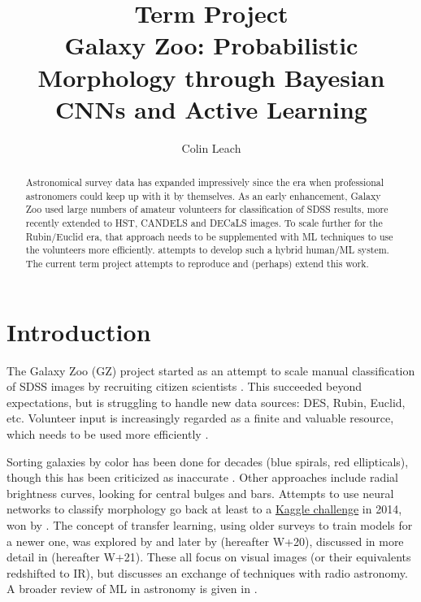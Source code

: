 \documentclass[preprint]{aastex631}
\begin{document}
\title{Term Project \\Galaxy Zoo: Probabilistic Morphology through Bayesian CNNs and Active Learning}

\author[0000-0003-3608-1546]{Colin Leach}

\begin{abstract}

Astronomical survey data has expanded impressively since the era when professional astronomers could keep up with it by themselves. As an early enhancement, Galaxy Zoo used large numbers of amateur volunteers for classification of SDSS results, more recently extended to HST, CANDELS and DECaLS images. To scale further for the Rubin/Euclid era, that approach needs to be supplemented with ML techniques to use the volunteers more efficiently. \citet{walmsley_galaxy_2020} attempts to develop such a hybrid human/ML system. The current term project attempts to reproduce and (perhaps) extend this work.\\

\end{abstract} 

\section{Introduction} \label{sec:intro}


The Galaxy Zoo (GZ) project started as an attempt to scale manual classification of SDSS images by recruiting citizen scientists \citep{2008MNRAS.389.1179L, lintott_crowd_2019}. This succeeded beyond expectations, but is struggling to handle new data sources: DES, Rubin, Euclid, etc. Volunteer input is increasingly regarded as a finite and valuable resource, which needs to be used more efficiently \citep{2020IAUS..341...99D}.

Sorting galaxies by color has been done for decades (blue spirals, red ellipticals), though this has been criticized as inaccurate \citep{smethurst_quantifying_2022}. Other approaches include radial brightness curves, looking for central bulges and bars. Attempts to use neural networks to classify morphology go back at least to a \href{https://www.kaggle.com/c/galaxy-zoo-the-galaxy-challenge}{Kaggle challenge} in 2014, won by \citet{2015MNRAS.450.1441D}. The concept of transfer learning, using older surveys to train models for a newer one, was explored by \citet{2019MNRAS.484...93D} and later by \citet{walmsley_galaxy_2020} (hereafter W+20), discussed in more detail in \citet{2021MNRAS} (hereafter W+21). These all focus on visual images (or their equivalents redshifted to IR), but \citet{2021arXiv211104353F} discusses an exchange of techniques with radio astronomy. A broader review of ML in astronomy is given in \citet{2020WDMKD..10.1349F}.
\end{document}
